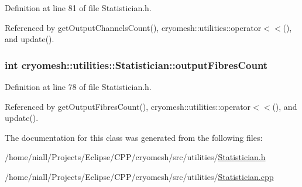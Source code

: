 \-Definition at line 81 of file \-Statistician.\-h.



\-Referenced by get\-Output\-Channels\-Count(), cryomesh\-::utilities\-::operator$<$$<$(), and update().

\hypertarget{classcryomesh_1_1utilities_1_1Statistician_a90aeaf6f65a5cad0b3936731378ea07a}{
\subsubsection[{output\-Fibres\-Count}]{\setlength{\rightskip}{0pt plus 5cm}int {\bf cryomesh\-::utilities\-::\-Statistician\-::output\-Fibres\-Count}}}\label{classcryomesh_1_1utilities_1_1Statistician_a90aeaf6f65a5cad0b3936731378ea07a}


\-Definition at line 78 of file \-Statistician.\-h.



\-Referenced by get\-Output\-Fibres\-Count(), cryomesh\-::utilities\-::operator$<$$<$(), and update().



\-The documentation for this class was generated from the following files\-:\begin{DoxyCompactItemize}
\item 
/home/niall/\-Projects/\-Eclipse/\-C\-P\-P/cryomesh/src/utilities/\hyperlink{Statistician_8h}{\-Statistician.\-h}\item 
/home/niall/\-Projects/\-Eclipse/\-C\-P\-P/cryomesh/src/utilities/\hyperlink{Statistician_8cpp}{\-Statistician.\-cpp}\end{DoxyCompactItemize}
